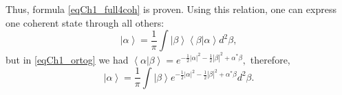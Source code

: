 Thus, formula \eqref{eqCh1_full4coh} is proven. Using this relation, one can express one coherent state through all others: 
\[
\left|\alpha\right> = \frac{1}{\pi}\int\left|\beta\right>\left<\beta\right|\left.\alpha\right> d^2 \beta,
\]
but in \eqref{eqCh1_ortog} we had
\(
\left<\alpha\right|\left.\beta\right> = 
e^{
-\frac{1}{2} \left|\alpha\right|^2  -\frac{1}{2} \left|\beta\right|^2
+
\alpha^{*} \beta
},
\)
therefore,
\begin{equation}
\left|\alpha\right> = \frac{1}{\pi}\int\left|\beta\right>
e^{
-\frac{1}{2} \left|\alpha\right|^2  -\frac{1}{2} \left|\beta\right|^2
+
\alpha^{*} \beta
} d^2 \beta.
\end{equation}